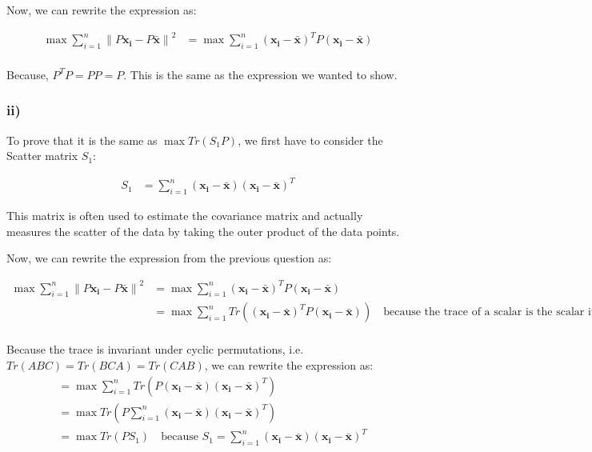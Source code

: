 \documentclass[12pt,a4paper,oneside]{paper}
\begin{document}
Now, we can rewrite the expression as:

\begin{align*}
    \max \sum_{i=1}^{n} \left\| P \bm{x_i} - P \bm{\bar{x}} \right\|^2 &= \max \sum_{i=1}^{n} \left( \bm{x_i} - \bm{\bar{x}} \right)^T P \left( \bm{x_i} - \bm{\bar{x}} \right) \\
\end{align*}

Because, $P^T P = P P = P$. This is the same as the expression we wanted to show.

\subsubsection*{ii)}

To prove that it is the same as $\max Tr(S_1 P)$, we first have to consider the Scatter matrix $S_1$:

\begin{align*}
    S_1 &= \sum_{i=1}^{n} \left( \bm{x_i} - \bm{\bar{x}} \right) \left( \bm{x_i} - \bm{\bar{x}} \right)^T
\end{align*}

This matrix is often used to estimate the covariance matrix and actually measures the scatter of the data by
taking the outer product of the data points.

Now, we can rewrite the expression from the previous question as:

\begin{align*}
    \max \sum_{i=1}^{n} \left\| P \bm{x_i} - P \bm{\bar{x}} \right\|^2 &= \max \sum_{i=1}^{n} \left( \bm{x_i} - \bm{\bar{x}} \right)^T P \left( \bm{x_i} - \bm{\bar{x}} \right) \\
    &= \max \sum_{i=1}^{n} Tr \left( \left( \bm{x_i} - \bm{\bar{x}} \right)^T P \left( \bm{x_i} - \bm{\bar{x}} \right) \right) \quad {\text{because the trace of a scalar is the scalar itself}} \\
\end{align*}

Because the trace is invariant under cyclic permutations, i.e. $Tr(ABC) = Tr(BCA) = Tr(CAB)$, we can rewrite the expression as:
\begin{align*}
    &= \max \sum_{i=1}^{n} Tr \left( P \left( \bm{x_i} - \bm{\bar{x}} \right) \left( \bm{x_i} - \bm{\bar{x}} \right)^T \right) \\
    &= \max Tr \left( P \sum_{i=1}^{n} \left( \bm{x_i} - \bm{\bar{x}} \right) \left( \bm{x_i} - \bm{\bar{x}} \right)^T \right) \\
    &= \max Tr \left( P S_1 \right) \quad {\text{because $S_1 = \sum_{i=1}^{n} \left( \bm{x_i} - \bm{\bar{x}} \right) \left( \bm{x_i} - \bm{\bar{x}} \right)^T$}} \\
\end{align*}
\end{document}
